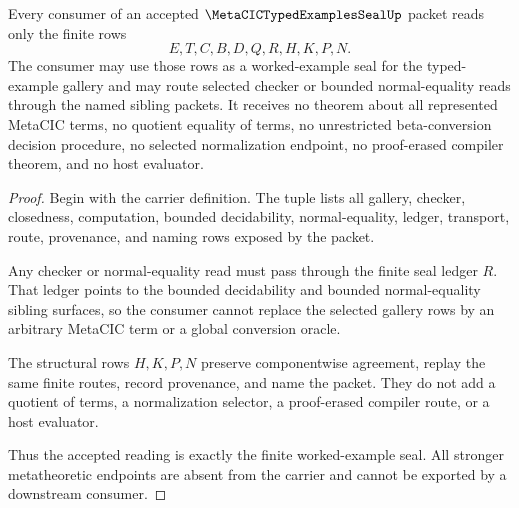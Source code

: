 \begin{theorem}
\label{thm:metacic-typedexamples-seal-nonescape}
Every consumer of an accepted $\MetaCICTypedExamplesSealUp$ packet reads only the finite rows
$$
E,T,C,B,D,Q,R,H,K,P,N.
$$
The consumer may use those rows as a worked-example seal for the typed-example gallery and may route selected checker or bounded normal-equality reads through the named sibling packets. It receives no theorem about all represented MetaCIC terms, no quotient equality of terms, no unrestricted beta-conversion decision procedure, no selected normalization endpoint, no proof-erased compiler theorem, and no host evaluator.
\end{theorem}
\begin{proof}
Begin with the carrier definition. The tuple lists all gallery, checker, closedness, computation, bounded decidability, normal-equality, ledger, transport, route, provenance, and naming rows exposed by the packet.

Any checker or normal-equality read must pass through the finite seal ledger $R$. That ledger points to the bounded decidability and bounded normal-equality sibling surfaces, so the consumer cannot replace the selected gallery rows by an arbitrary MetaCIC term or a global conversion oracle.

The structural rows $H,K,P,N$ preserve componentwise agreement, replay the same finite routes, record provenance, and name the packet. They do not add a quotient of terms, a normalization selector, a proof-erased compiler route, or a host evaluator.

Thus the accepted reading is exactly the finite worked-example seal. All stronger metatheoretic endpoints are absent from the carrier and cannot be exported by a downstream consumer.
\end{proof}


\begin{closurestatus}{\MetaCICTypedExamplesSealUp}
  \theoryclosure{\seedClosure}
  \formalstatus{\unformalizedV}
\end{closurestatus}
